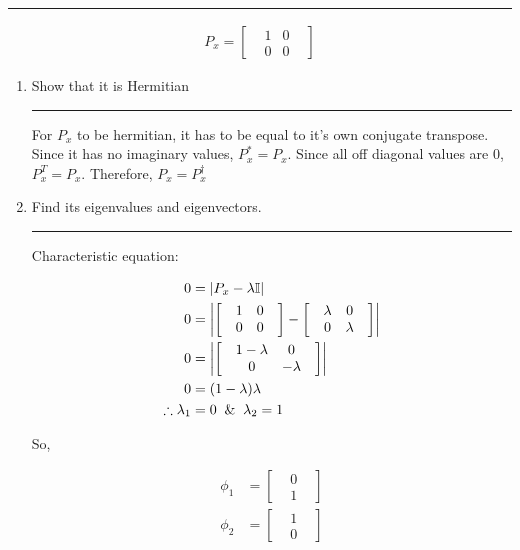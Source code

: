 \documentclass[12pt, oneside]{article}
\newenvironment{answer}
  {\vspace*{0.2cm} \rule{12cm}{0.02cm} \vspace*{0.2cm}}
  {\vspace*{0.2cm}}
\begin{document}
\begin{enumerate}
  \begin{answer}
    \begin{align*}
      P_x = \begin{bmatrix}
              & 1 &0 &\\
              &0  &0 &
            \end{bmatrix}
    \end{align*}
  \end{answer}

  \begin{enumerate}
    \item Show that it is Hermitian

    \begin{answer}
      For $P_x$ to be hermitian, it has to be equal to it's own conjugate transpose. Since it has no imaginary values, $P_x^* = P_x$. Since all off diagonal values are $0$, $P_x^T = P_x$. Therefore, $P_x = P_x^\dagger$
    \end{answer}

    \item Find its eigenvalues and eigenvectors.

    \begin{answer}
      Characteristic equation:

      \begin{align*}
        0 &= \abs{P_x -\lambda \mathbb{I}}\\
        0 &= \abs{\begin{bmatrix} &1 &0 &\\ &0 &0 & \end{bmatrix} - \begin{bmatrix} &\lambda &0 &\\ &0 &\lambda & \end{bmatrix}}\\
        0 &= \abs{\begin{bmatrix} &1 - \lambda &0 &\\ &0 &-\lambda & \end{bmatrix}}\\
        0 &= (1 - \lambda)\lambda\\
        \therefore \lambda_1 &= 0 \; \; \& \; \; \lambda_2 = 1
      \end{align*}

      So,

      \begin{align*}
        \phi_1 &= \begin{bmatrix}& 0 &\\ & 1 & \end{bmatrix}\\
        \phi_2 &= \begin{bmatrix}& 1 &\\ & 0 & \end{bmatrix}
      \end{align*}


\end{answer}
\end{enumerate}
\end{enumerate}
\end{document}
